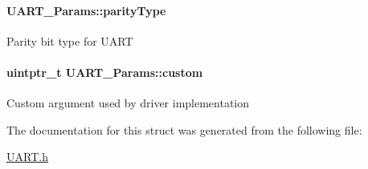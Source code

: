 \paragraph[{parity\+Type}]{ U\+A\+R\+T\+\_\+\+Params\+::parity\+Type}\label{struct_u_a_r_t___params_acaa90dc09cd820477c5bfaae152a2010}
Parity bit type for U\+A\+R\+T 
\paragraph[{custom}]{\setlength{\rightskip}{0pt plus 5cm}uintptr\+\_\+t U\+A\+R\+T\+\_\+\+Params\+::custom}\label{struct_u_a_r_t___params_a9ca9d3b9e9a3c0a73704f79278703abb}
Custom argument used by driver implementation 

The documentation for this struct was generated from the following file\+:\begin{DoxyCompactItemize}
\item 
\hyperlink{_u_a_r_t_8h}{U\+A\+R\+T.\+h}\end{DoxyCompactItemize}
